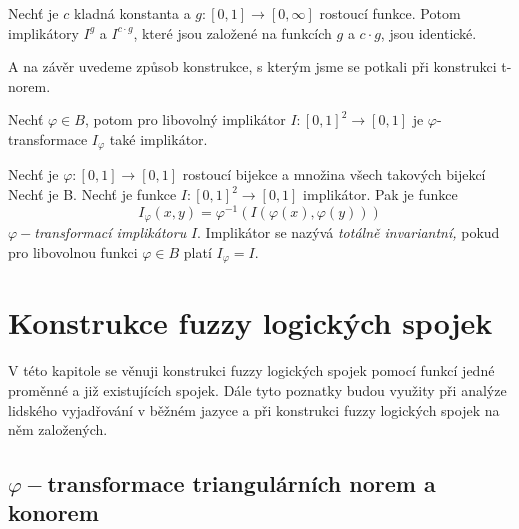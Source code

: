 \begin{sentence} \cite{habilitace}
    Nech\v t je $c$ kladn\'a konstanta a $g:[0,1] \to [0,\infty]$
    rostoucí  funkce. Potom implik\'atory $I^g$ a $I^{c \cdot g}$,
    které jsou zalo\v zen\'e na  funkcích $g$ a $c \cdot g$, jsou
    identick\'e.
\end{sentence}
A na z\'av\v er uvedeme zp\r usob konstrukce, s kter\'ym jsme se potkali p\v ri konstrukci t-norem.

\begin{sentence}\cite{Springer}
    Nech\v t $\varphi \in B$, potom pro libovolný implikátor $I: [0,1]^2 \rightarrow [0,1]$ je $\varphi$-transformace $I_\varphi$ také implikátor.
\end{sentence}

\begin{definition}\cite{Springer}
    Nech\v t je $\varphi:[0,1] \rightarrow [0,1]$  rostoucí
    bijekce a množina všech takových bijekcí Nech\v t je B. Nech\v t je funkce
    $I:[0,1]^2\rightarrow [0,1]$ 
    implikátor.
    Pak je funkce
    $$I_\varphi(x,y)=\varphi^{-1}(I(\varphi (x), \varphi (y)))$$
    $\varphi-${\em transformací implikátoru} $I.$ Implikátor se nazývá
    {\em totálně invariantní,} pokud pro libovolnou funkci $\varphi \in B$ platí $I_\varphi=I.$\\
\end{definition}

\section{Konstrukce fuzzy logick\'ych spojek}

V této kapitole se věnuji konstrukci fuzzy logických spojek pomocí funkcí jedné proměnné a již existujících spojek. Dále tyto poznatky budou využity při analýze lidského vyjadřování v běžném jazyce a při konstrukci fuzzy logických spojek na něm založených.

\subsection{$\varphi-$transformace triangulárních norem a konorem}

